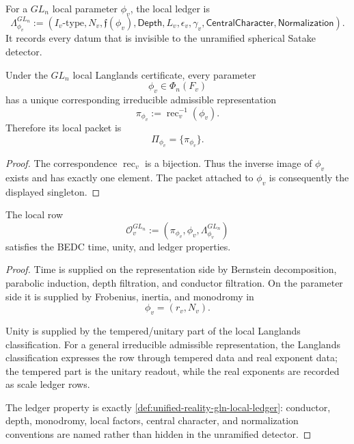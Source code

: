 \begin{definition}
\label{def:unified-reality-gln-local-ledger}
For a $GL_n$ local parameter $\phi_v$, the local ledger is
$$
\Lambda^{GL_n}_{\phi_v}
:=
(I_v\text{-type},N_v,\mathfrak f(\phi_v),
\mathsf{Depth},L_v,\epsilon_v,\gamma_v,
\mathsf{CentralCharacter},\mathsf{Normalization}).
$$
It records every datum that is invisible to the unramified spherical
Satake detector.
\end{definition}

\begin{theorem}
\label{thm:unified-reality-gln-packets-singleton}
Under the $GL_n$ local Langlands certificate, every parameter
$$
\phi_v\in\Phi_n(F_v)
$$
has a unique corresponding irreducible admissible representation
$$
\pi_{\phi_v}
:=
\operatorname{rec}_v^{-1}(\phi_v).
$$
Therefore its local packet is
$$
\Pi_{\phi_v}=\{\pi_{\phi_v}\}.
$$
\end{theorem}
\begin{proof}
The correspondence $\operatorname{rec}_v$ is a bijection. Thus the
inverse image of $\phi_v$ exists and has exactly one element. The packet
attached to $\phi_v$ is consequently the displayed singleton.
\end{proof}

\begin{theorem}
\label{thm:unified-reality-gln-local-three-properties}
The local row
$$
\mathcal O^{GL_n}_v
:=
(\pi_{\phi_v},\phi_v,\Lambda^{GL_n}_{\phi_v})
$$
satisfies the BEDC time, unity, and ledger properties.
\end{theorem}
\begin{proof}
Time is supplied on the representation side by Bernstein decomposition,
parabolic induction, depth filtration, and conductor filtration. On the
parameter side it is supplied by Frobenius, inertia, and monodromy in
$$
\phi_v=(r_v,N_v).
$$

Unity is supplied by the tempered/unitary part of the local Langlands
classification. For a general irreducible admissible representation,
the Langlands classification expresses the row through tempered data
and real exponent data; the tempered part is the unitary readout, while
the real exponents are recorded as scale ledger rows.

The ledger property is exactly
\autoref{def:unified-reality-gln-local-ledger}: conductor, depth,
monodromy, local factors, central character, and normalization
conventions are named rather than hidden in the unramified detector.
\end{proof}

